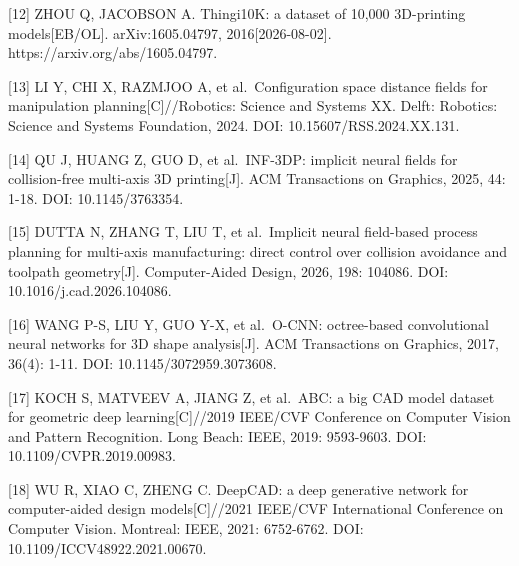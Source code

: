 {[}12{]} ZHOU Q, JACOBSON A. Thingi10K: a dataset of 10,000 3D-printing models{[}EB/OL{]}. arXiv:1605.04797, 2016{[}2026-08-02{]}. https://arxiv.org/abs/1605.04797.

{[}13{]} LI Y, CHI X, RAZMJOO A, et al.~Configuration space distance fields for manipulation planning{[}C{]}//Robotics: Science and Systems XX. Delft: Robotics: Science and Systems Foundation, 2024. DOI: 10.15607/RSS.2024.XX.131.

{[}14{]} QU J, HUANG Z, GUO D, et al.~INF-3DP: implicit neural fields for collision-free multi-axis 3D printing{[}J{]}. ACM Transactions on Graphics, 2025, 44: 1-18. DOI: 10.1145/3763354.

{[}15{]} DUTTA N, ZHANG T, LIU T, et al.~Implicit neural field-based process planning for multi-axis manufacturing: direct control over collision avoidance and toolpath geometry{[}J{]}. Computer-Aided Design, 2026, 198: 104086. DOI: 10.1016/j.cad.2026.104086.

{[}16{]} WANG P-S, LIU Y, GUO Y-X, et al.~O-CNN: octree-based convolutional neural networks for 3D shape analysis{[}J{]}. ACM Transactions on Graphics, 2017, 36(4): 1-11. DOI: 10.1145/3072959.3073608.

{[}17{]} KOCH S, MATVEEV A, JIANG Z, et al.~ABC: a big CAD model dataset for geometric deep learning{[}C{]}//2019 IEEE/CVF Conference on Computer Vision and Pattern Recognition. Long Beach: IEEE, 2019: 9593-9603. DOI: 10.1109/CVPR.2019.00983.

{[}18{]} WU R, XIAO C, ZHENG C. DeepCAD: a deep generative network for computer-aided design models{[}C{]}//2021 IEEE/CVF International Conference on Computer Vision. Montreal: IEEE, 2021: 6752-6762. DOI: 10.1109/ICCV48922.2021.00670.

